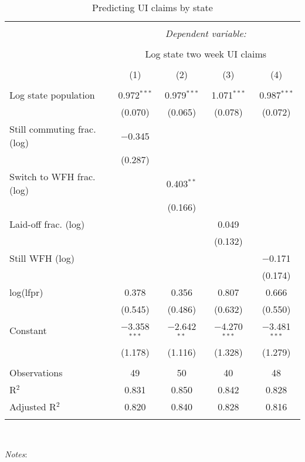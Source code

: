 
\begin{table}[!htbp] \centering 
  \caption{Predicting UI claims by state} 
  \label{tab:ui} 
\small 
\begin{tabular}{@{\extracolsep{5pt}}lcccc} 
\\[-1.8ex]\hline 
\hline \\[-1.8ex] 
 & \multicolumn{4}{c}{\textit{Dependent variable:}} \\ 
\cline{2-5} 
\\[-1.8ex] & \multicolumn{4}{c}{Log state two week UI claims} \\ 
\\[-1.8ex] & (1) & (2) & (3) & (4)\\ 
\hline \\[-1.8ex] 
 Log state population & 0.972$^{***}$ & 0.979$^{***}$ & 1.071$^{***}$ & 0.987$^{***}$ \\ 
  & (0.070) & (0.065) & (0.078) & (0.072) \\ 
  Still commuting frac. (log) & $-$0.345 &  &  &  \\ 
  & (0.287) &  &  &  \\ 
  Switch to WFH frac. (log) &  & 0.403$^{**}$ &  &  \\ 
  &  & (0.166) &  &  \\ 
  Laid-off frac. (log) &  &  & 0.049 &  \\ 
  &  &  & (0.132) &  \\ 
  Still WFH (log) &  &  &  & $-$0.171 \\ 
  &  &  &  & (0.174) \\ 
  log(lfpr) & 0.378 & 0.356 & 0.807 & 0.666 \\ 
  & (0.545) & (0.486) & (0.632) & (0.550) \\ 
  Constant & $-$3.358$^{***}$ & $-$2.642$^{**}$ & $-$4.270$^{***}$ & $-$3.481$^{***}$ \\ 
  & (1.178) & (1.116) & (1.328) & (1.279) \\ 
 \hline \\[-1.8ex] 
Observations & 49 & 50 & 40 & 48 \\ 
R$^{2}$ & 0.831 & 0.850 & 0.842 & 0.828 \\ 
Adjusted R$^{2}$ & 0.820 & 0.840 & 0.828 & 0.816 \\ 
\hline 
\hline \\[-1.8ex] 
\end{tabular}
\\
\begin{minipage}{1.0 \textwidth}
{\footnotesize \emph{Notes}:
\starlanguage}
\end{minipage}
\end{table}
